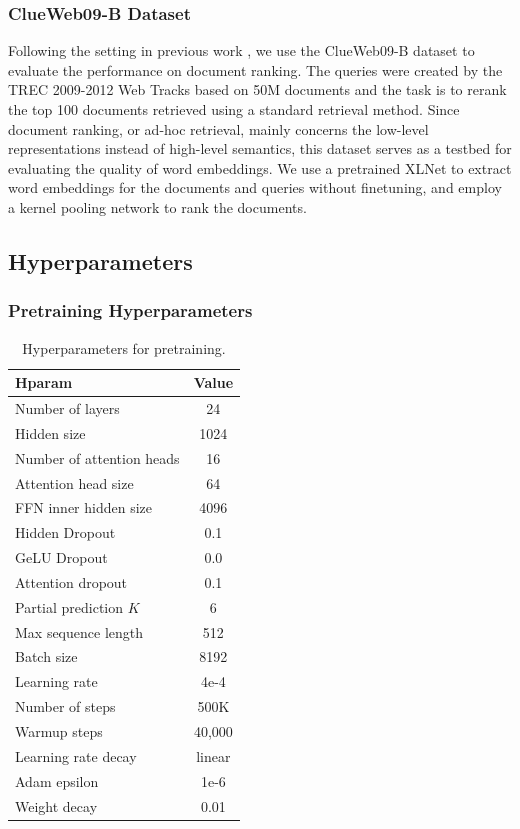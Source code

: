 \subsubsection{ClueWeb09-B Dataset}

Following the setting in previous work \cite{dai2018convolutional}, we use the ClueWeb09-B dataset to evaluate the performance on document ranking. The queries were created by the TREC 2009-2012 Web Tracks based on 50M documents and the task is to rerank the top 100 documents retrieved using a standard retrieval method. Since document ranking, or ad-hoc retrieval, mainly concerns the low-level representations instead of high-level semantics, this dataset serves as a testbed for evaluating the quality of word embeddings. We use a pretrained XLNet to extract word embeddings for the documents and queries without finetuning, and employ a kernel pooling network \cite{xiong2017end} to rank the documents.

\subsection{Hyperparameters} \label{sec:hp}

\subsubsection{Pretraining Hyperparameters}

\begin{table}[h!]
  \small
  \centering
  
  \begin{tabular}{lc}
    \toprule
    \bf Hparam & \bf Value \\
    \midrule
    Number of layers & 24 \\
    Hidden size & 1024 \\
    Number of attention heads & 16 \\
    Attention head size & 64 \\
    FFN inner hidden size & 4096 \\
    Hidden Dropout & 0.1 \\
    GeLU Dropout & 0.0 \\
    Attention dropout & 0.1 \\
    Partial prediction $K$ & 6 \\
    Max sequence length & 512 \\
    Batch size & 8192 \\
    Learning rate & 4e-4 \\
    Number of steps & 500K \\
    Warmup steps & 40,000 \\
    Learning rate decay & linear \\
    Adam epsilon  & 1e-6 \\
    Weight decay & 0.01 \\
    \bottomrule
  \end{tabular}
  \caption{\small
    Hyperparameters for pretraining.
  }
  \label{tab:hp-pretrain}
  \vspace{-1em}
\end{table}

